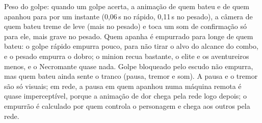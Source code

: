 \documentclass[11pt,a4paper]{article}
\begin{document}
Peso do golpe: quando um golpe acerta, a animação de quem bateu e de quem apanhou para por um instante (0,06\,s no rápido, 0,11\,s no pesado), a câmera de quem bateu treme de leve (mais no pesado) e toca um som de confirmação só para ele, mais grave no pesado. Quem apanha é empurrado para longe de quem bateu: o golpe rápido empurra pouco, para não tirar o alvo do alcance do combo, e o pesado empurra o dobro; o minion recua bastante, o elite e os aventureiros menos, e o Necromante quase nada. Golpe bloqueado pelo escudo não empurra, mas quem bateu ainda sente o tranco (pausa, tremor e som). A pausa e o tremor são só visuais; em rede, a pausa em quem apanhou numa máquina remota é quase imperceptível, porque a animação de dor chega pela rede logo depois; o empurrão é calculado por quem controla o personagem e chega aos outros pela rede.
\end{document}
